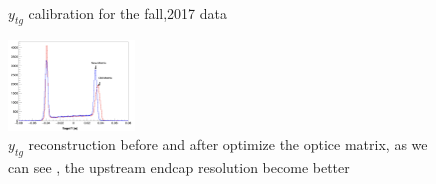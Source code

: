 \begin{figure}[htbp]
\\
 \centering
\caption{$y_{tg}$ calibration for the fall,2017 data}
\label{optics_plt5}
\end{figure}

\begin{figure}
 	\begin{center}
 		\includegraphics[width=0.3\textwidth] {./optics_plot/optics_2.png}
 		\caption{$y_{tg}$ reconstruction before and after optimize the optice matrix, as we can see , the upstream endcap resolution become better} \label{optics_plt6}
 	\end{center}
\end{figure}   
